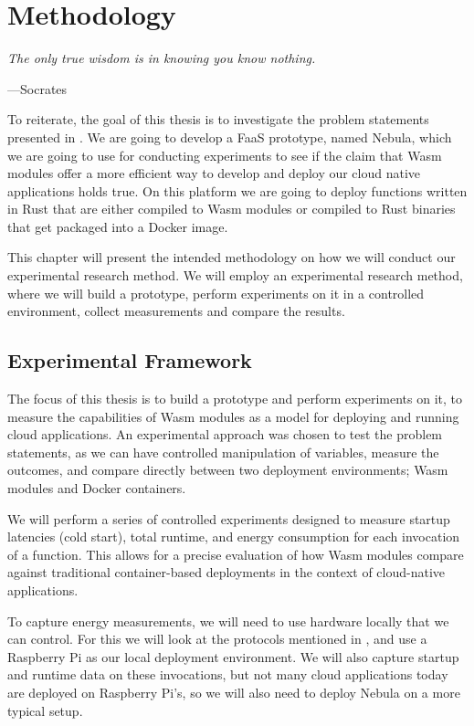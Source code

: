 \documentclass[
  table]{report}
\begin{document}
\chapter{Methodology} 
\label{chap:method}

\setlength{}
\epigraph{\itshape 
The only true wisdom is in knowing you know nothing.
}{---Socrates}

To reiterate, the goal of this thesis is to investigate the problem
statements presented in . We are going to develop a
FaaS prototype, named Nebula, which we are going to use for conducting
experiments to see if the claim that \ac{Wasm} modules offer a more
efficient way to develop and deploy our cloud native applications holds
true. On this platform we are going to deploy functions written in Rust
that are either compiled to \ac{Wasm} modules or compiled to Rust
binaries that get packaged into a Docker image.

This chapter will present the intended methodology on how we will
conduct our experimental research method. We will employ an experimental
research method, where we will build a prototype, perform experiments on
it in a controlled environment, collect measurements and compare the
results.

\section{Experimental Framework}
\label{sect:exp_frame}

The focus of this thesis is to build a prototype and perform experiments
on it, to measure the capabilities of \ac{Wasm} modules as a model for
deploying and running cloud applications. An experimental approach was
chosen to test the problem statements, as we can have controlled
manipulation of variables, measure the outcomes, and compare directly
between two deployment environments; \ac{Wasm} modules and Docker
containers.

We will perform a series of controlled experiments designed to measure
startup latencies (cold start), total runtime, and energy consumption
for each invocation of a function. This allows for a precise evaluation
of how \ac{Wasm} modules compare against traditional container-based
deployments in the context of cloud-native applications.

To capture energy measurements, we will need to use hardware locally
that we can control. For this we will look at the protocols mentioned in
, and use a Raspberry Pi as our local
deployment environment. We will also capture startup and runtime data on
these invocations, but not many cloud applications today are deployed on
Raspberry Pi's, so we will also need to deploy Nebula on a more typical
setup.
\end{document}

